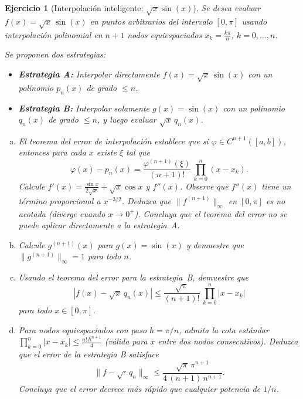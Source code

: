 \documentclass[12pt]{article}
\newtheorem{exercise}{Ejercicio}
\begin{document}
\begin{exercise}[Interpolación inteligente: $\sqrt{x}\sin(x)$]
Se desea evaluar $f(x) = \sqrt{x}\,\sin(x)$ en puntos arbitrarios del intervalo $[0, \pi]$ usando interpolación polinomial en $n+1$ nodos equiespaciados $x_k = \frac{k\pi}{n}$, $k=0,\ldots,n$.

Se proponen dos estrategias:
\begin{itemize}
\item \textbf{Estrategia A:} Interpolar directamente $f(x) = \sqrt{x}\,\sin(x)$ con un polinomio $p_n(x)$ de grado $\leq n$.
\item \textbf{Estrategia B:} Interpolar solamente $g(x) = \sin(x)$ con un polinomio $q_n(x)$ de grado $\leq n$, y luego evaluar $\sqrt{x}\,q_n(x)$.
\end{itemize}

\begin{enumerate}[(a)]
\item El teorema del error de interpolación establece que si $\varphi \in C^{n+1}([a,b])$, entonces para cada $x$ existe $\xi$ tal que
\[
\varphi(x) - p_n(x) = \frac{\varphi^{(n+1)}(\xi)}{(n+1)!}\,\prod_{k=0}^{n}(x - x_k).
\]
Calcule $f'(x) = \frac{\sin x}{2\sqrt{x}} + \sqrt{x}\cos x$ y $f''(x)$. Observe que $f''(x)$ tiene un término proporcional a $x^{-3/2}$. Deduzca que $\|f^{(n+1)}\|_\infty$ en $[0, \pi]$ es no acotada (diverge cuando $x \to 0^+$). Concluya que el teorema del error no se puede aplicar directamente a la estrategia~A.

\item Calcule $g^{(n+1)}(x)$ para $g(x) = \sin(x)$ y demuestre que $\|g^{(n+1)}\|_\infty = 1$ para todo $n$.

\item Usando el teorema del error para la estrategia~B, demuestre que
\[
|f(x) - \sqrt{x}\,q_n(x)| \leq \frac{\sqrt{\pi}}{(n+1)!}\,\prod_{k=0}^{n}|x - x_k|
\]
para todo $x \in [0, \pi]$.

\item Para nodos equiespaciados con paso $h = \pi/n$, admita la cota estándar $\prod_{k=0}^{n}|x-x_k| \leq \frac{n!\, h^{n+1}}{4}$ (válida para $x$ entre dos nodos consecutivos). Deduzca que el error de la estrategia B satisface
\[
\|f - \sqrt{\cdot}\, q_n\|_\infty \leq \frac{\sqrt{\pi}\,\pi^{n+1}}{4\,(n+1)\,n^{n+1}}.
\]
Concluya que el error decrece más rápido que cualquier potencia de $1/n$.
\end{enumerate}
\end{exercise}
\end{document}

